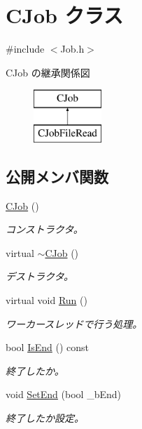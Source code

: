 \hypertarget{class_c_job}{}\section{C\+Job クラス}
\label{class_c_job}


{\ttfamily \#include $<$Job.\+h$>$}

C\+Job の継承関係図\begin{figure}[H]
\begin{center}
\leavevmode
\includegraphics[height=2.000000cm]{class_c_job}
\end{center}
\end{figure}
\subsection*{公開メンバ関数}
\begin{DoxyCompactItemize}
\item 
\hyperlink{class_c_job_ac1e5467251edcba0961d167840efb4a7}{C\+Job} ()
\begin{DoxyCompactList}\small\item\em コンストラクタ。 \end{DoxyCompactList}\item 
virtual \hyperlink{class_c_job_a3aba2e1e742f8af183b403b1dd0aab44}{$\sim$\+C\+Job} ()
\begin{DoxyCompactList}\small\item\em デストラクタ。 \end{DoxyCompactList}\item 
virtual void \hyperlink{class_c_job_af5b3f6138549671f6728bae1113777fe}{Run} ()
\begin{DoxyCompactList}\small\item\em ワーカースレッドで行う処理。 \end{DoxyCompactList}\item 
bool \hyperlink{class_c_job_aebcde411175b14f3347639a39aae1460}{Is\+End} () const 
\begin{DoxyCompactList}\small\item\em 終了したか。 \end{DoxyCompactList}\item 
void \hyperlink{class_c_job_a371cc1b43d7d50b14d10fd55d01638d3}{Set\+End} (bool \+\_\+b\+End)
\begin{DoxyCompactList}\small\item\em 終了したか設定。 \end{DoxyCompactList}\end{DoxyCompactItemize}
